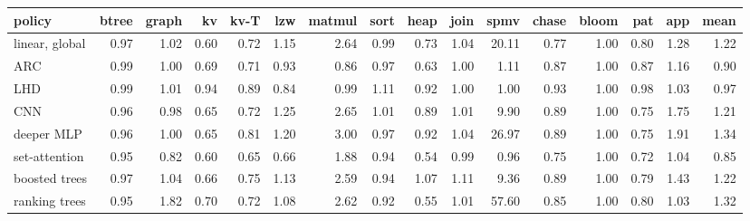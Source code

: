 \begin{tabular}{lrrrrrrrrrrrrrrr}
\toprule
policy & btree & graph & kv & kv-T & lzw & matmul & sort & heap & join & spmv & chase & bloom & pat & app & mean \\
\midrule
linear, global & 0.97 & 1.02 & 0.60 & 0.72 & 1.15 & 2.64 & 0.99 & 0.73 & 1.04 & 20.11 & 0.77 & 1.00 & 0.80 & 1.28 & 1.22 \\
ARC & 0.99 & 1.00 & 0.69 & 0.71 & 0.93 & 0.86 & 0.97 & 0.63 & 1.00 & 1.11 & 0.87 & 1.00 & 0.87 & 1.16 & 0.90 \\
LHD & 0.99 & 1.01 & 0.94 & 0.89 & 0.84 & 0.99 & 1.11 & 0.92 & 1.00 & 1.00 & 0.93 & 1.00 & 0.98 & 1.03 & 0.97 \\
CNN & 0.96 & 0.98 & 0.65 & 0.72 & 1.25 & 2.65 & 1.01 & 0.89 & 1.01 & 9.90 & 0.89 & 1.00 & 0.75 & 1.75 & 1.21 \\
deeper MLP & 0.96 & 1.00 & 0.65 & 0.81 & 1.20 & 3.00 & 0.97 & 0.92 & 1.04 & 26.97 & 0.89 & 1.00 & 0.75 & 1.91 & 1.34 \\
set-attention & 0.95 & 0.82 & 0.60 & 0.65 & 0.66 & 1.88 & 0.94 & 0.54 & 0.99 & 0.96 & 0.75 & 1.00 & 0.72 & 1.04 & 0.85 \\
boosted trees & 0.97 & 1.04 & 0.66 & 0.75 & 1.13 & 2.59 & 0.94 & 1.07 & 1.11 & 9.36 & 0.89 & 1.00 & 0.79 & 1.43 & 1.22 \\
ranking trees & 0.95 & 1.82 & 0.70 & 0.72 & 1.08 & 2.62 & 0.92 & 0.55 & 1.01 & 57.60 & 0.85 & 1.00 & 0.80 & 1.03 & 1.32 \\
\bottomrule
\end{tabular}
